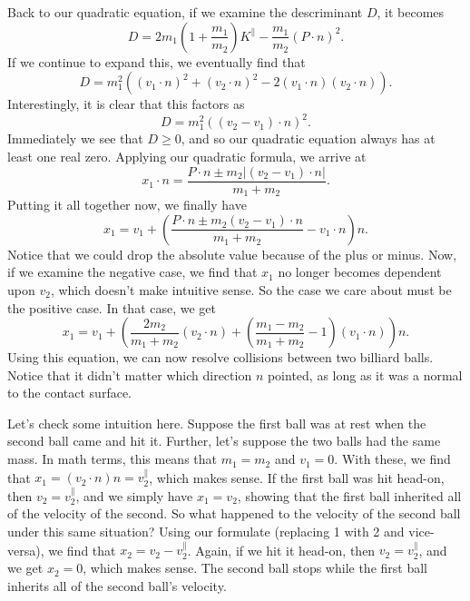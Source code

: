 \documentclass[12pt]{article}
\newcommand{\prl}{\parallel}
\begin{document}
Back to our quadratic equation, if we examine the descriminant $D$, it becomes
\begin{equation*}
D = 2m_1\left(1+\frac{m_1}{m_2}\right)K^{\prl}-\frac{m_1}{m_2}(P\cdot n)^2.
\end{equation*}
If we continue to expand this, we eventually find that
\begin{equation*}
D = m_1^2\left((v_1\cdot n)^2 + (v_2\cdot n)^2 - 2(v_1\cdot n)(v_2\cdot n)\right).
\end{equation*}
Interestingly, it is clear that this factors as
\begin{equation*}
D = m_1^2\left((v_2-v_1)\cdot n\right)^2.
\end{equation*}
Immediately we see that $D\geq 0$, and so our quadratic equation always has at least one real zero.
Applying our quadratic formula, we arrive at
\begin{equation*}
x_1\cdot n = \frac{P\cdot n\pm m_2|(v_2-v_1)\cdot n|}{m_1+m_2}.
\end{equation*}
Putting it all together now, we finally have
\begin{equation*}
x_1 = v_1 + \left(\frac{P\cdot n\pm m_2(v_2-v_1)\cdot n}{m_1+m_2}-v_1\cdot n\right)n.
\end{equation*}
Notice that we could drop the absolute value because of the plus or minus.  Now, if we examine the
negative case, we find that $x_1$ no longer becomes dependent upon $v_2$, which doesn't make intuitive sense.
So the case we care about must be the positive case.  In that case, we get
\begin{equation*}
x_1 = v_1 + \left(\frac{2m_2}{m_1+m_2}(v_2\cdot n)+\left(\frac{m_1-m_2}{m_1+m_2}-1\right)(v_1\cdot n)\right)n.
\end{equation*}
Using this equation, we can now resolve collisions between two billiard balls.  Notice that it didn't matter which direction $n$ pointed, as long as it was a normal to the contact surface.

Let's check some intuition here.
Suppose the first ball was at rest when the second ball came and hit it.  Further, let's suppose the two balls
had the same mass.  In math terms, this means that $m_1=m_2$ and $v_1=0$.  With these, we find
that $x_1=(v_2\cdot n)n=v_2^{\prl}$, which makes sense.  If the first ball was hit head-on, then $v_2=v_2^{\prl}$,
and we simply have $x_1=v_2$, showing that the first ball inherited all of the velocity of the second.  So what
happened to the velocity of the second ball under this same situation?  Using our formulate (replacing 1 with 2 and vice-versa),
we find that $x_2=v_2-v_2^{\prl}$.  Again, if we hit it head-on, then $v_2=v_2^{\prl}$, and we get $x_2=0$,
which makes sense.  The second ball stops while the first ball inherits all of the second ball's velocity.
\end{document}
